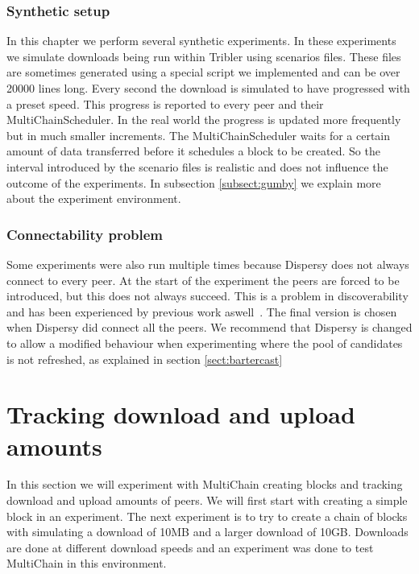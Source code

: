 \subsubsection{Synthetic setup}
In this chapter we perform several synthetic experiments.
In these experiments we simulate downloads being run within Tribler using scenarios files.
These files are sometimes generated using a special script we implemented and can be over 20000 lines long.
Every second the download is simulated to have progressed with a preset speed.
This progress is reported to every peer and their MultiChainScheduler.
In the real world the progress is updated more frequently but in much smaller increments.
The MultiChainScheduler waits for a certain amount of data transferred before it schedules a block to be created.
So the interval introduced by the scenario files is realistic and does not influence the outcome of the experiments.
In subsection \ref{subsect:gumby} we explain more about the experiment environment.

\subsubsection{Connectability problem}

Some experiments were also run multiple times because Dispersy does not always connect to every peer.
At the start of the experiment the peers are forced to be introduced,
but this does not always succeed.
This is a problem in discoverability and has been experienced by previous work aswell~\cite{ruigrok-anonymous}.
The final version is chosen when Dispersy did connect all the peers.
We recommend that Dispersy is changed to allow a modified behaviour when experimenting
where the pool of candidates is not refreshed,
as explained in section \ref{sect:bartercast}



\section{Tracking download and upload amounts}
In this section we will experiment with MultiChain creating blocks and tracking download and upload amounts of peers.
We will first start with creating a simple block in an experiment.
The next experiment is to try to create a chain of blocks with simulating a download of 10MB
and a larger download of 10GB.
Downloads are done at different download speeds and an experiment was done to test MultiChain in this environment.

